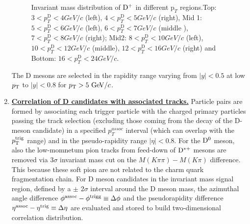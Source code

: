 \begin{enumerate}
\begin{figure}[!htp]
\caption{Invariant mass distribution of ${\rm D^+}$ in different $\text{p}_T$ regions.Top: $3< p_{T}^{\text{D}}< 4 GeV/c$ (left), $4< p_{T}^{\text{D}}< 5 GeV/c$ (right), Mid 1: $5< p_{T}^{\text{D}}< 6 GeV/c$ (left), $6 < p_{T}^{\text{D}} < 7 GeV/c$ (middle ), $7< p_{T}^{\text{D}}< 8 GeV/c$ (right); Mid2: $8< p_{T}^{\text{D}}< 10GeV/c$ (left), $10< p_{T}^{\text{D}}< 12 GeV/c$ (middle), $12 < p_{T}^{\text{D}}< 16 GeV/c$ (right) and Bottom: $16<p_{T}^{\text{D}}< 24 GeV/c$.}
\label{fig:InvMass}
\end{figure}


The D mesons are selected in the rapidity range varying from $|y|<0.5$ at low $p_{\rm T}$ to $|y|<0.8$ for $p_{\rm T}>5~\mathrm{GeV}/c$. %

\item
\underline {\bf Correlation of D candidates with associated tracks.}
Particle pairs are formed by associating each trigger particle with
the charged primary particles passing the track selection (excluding those coming from the decay of the D-meson candidate) in a specified $p^{assoc}_{T}$
interval (which can overlap with the $p_{\rm T}^{\rm trig}$ range) and in the pseudo-rapidity range $|\eta|<0.8$. For the ${\rm D^0}$ meson, also the low-momnetum pion tracks from feed-down of ${\rm D^{*+}}$ mesons are removed via 3$\sigma$ invariant mass cut on the $M(K\pi\pi)-M(K\pi)$ difference. This because these soft pion are not related to the charm quark fragmentation chain.
For D meson candidates in the invariant mass signal region, defined by a $\pm$ 2$\sigma$ interval around the D meson mass, the azimuthal angle difference $\phi^{\rm assoc}-\phi^{\rm trigg}\equiv\Delta\phi$
and the pseudorapidity difference $\eta^{\rm assoc}-\eta^{\rm trig}\equiv\Delta \eta$ are evaluated and stored to build two-dimensional correlation distribution. %


\end{enumerate}
